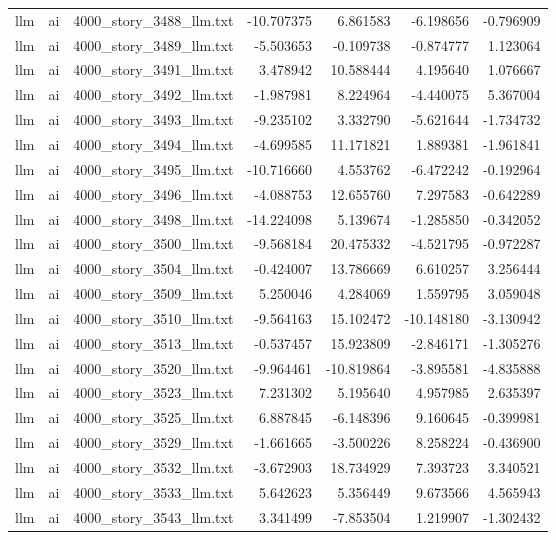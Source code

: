 \begin{longtable}{lllrrrr}
llm & ai & 4000\_story\_3488\_llm.txt & -10.707375 & 6.861583 & -6.198656 & -0.796909 \\
llm & ai & 4000\_story\_3489\_llm.txt & -5.503653 & -0.109738 & -0.874777 & 1.123064 \\
llm & ai & 4000\_story\_3491\_llm.txt & 3.478942 & 10.588444 & 4.195640 & 1.076667 \\
llm & ai & 4000\_story\_3492\_llm.txt & -1.987981 & 8.224964 & -4.440075 & 5.367004 \\
llm & ai & 4000\_story\_3493\_llm.txt & -9.235102 & 3.332790 & -5.621644 & -1.734732 \\
llm & ai & 4000\_story\_3494\_llm.txt & -4.699585 & 11.171821 & 1.889381 & -1.961841 \\
llm & ai & 4000\_story\_3495\_llm.txt & -10.716660 & 4.553762 & -6.472242 & -0.192964 \\
llm & ai & 4000\_story\_3496\_llm.txt & -4.088753 & 12.655760 & 7.297583 & -0.642289 \\
llm & ai & 4000\_story\_3498\_llm.txt & -14.224098 & 5.139674 & -1.285850 & -0.342052 \\
llm & ai & 4000\_story\_3500\_llm.txt & -9.568184 & 20.475332 & -4.521795 & -0.972287 \\
llm & ai & 4000\_story\_3504\_llm.txt & -0.424007 & 13.786669 & 6.610257 & 3.256444 \\
llm & ai & 4000\_story\_3509\_llm.txt & 5.250046 & 4.284069 & 1.559795 & 3.059048 \\
llm & ai & 4000\_story\_3510\_llm.txt & -9.564163 & 15.102472 & -10.148180 & -3.130942 \\
llm & ai & 4000\_story\_3513\_llm.txt & -0.537457 & 15.923809 & -2.846171 & -1.305276 \\
llm & ai & 4000\_story\_3520\_llm.txt & -9.964461 & -10.819864 & -3.895581 & -4.835888 \\
llm & ai & 4000\_story\_3523\_llm.txt & 7.231302 & 5.195640 & 4.957985 & 2.635397 \\
llm & ai & 4000\_story\_3525\_llm.txt & 6.887845 & -6.148396 & 9.160645 & -0.399981 \\
llm & ai & 4000\_story\_3529\_llm.txt & -1.661665 & -3.500226 & 8.258224 & -0.436900 \\
llm & ai & 4000\_story\_3532\_llm.txt & -3.672903 & 18.734929 & 7.393723 & 3.340521 \\
llm & ai & 4000\_story\_3533\_llm.txt & 5.642623 & 5.356449 & 9.673566 & 4.565943 \\
llm & ai & 4000\_story\_3543\_llm.txt & 3.341499 & -7.853504 & 1.219907 & -1.302432 \\

\end{longtable}
